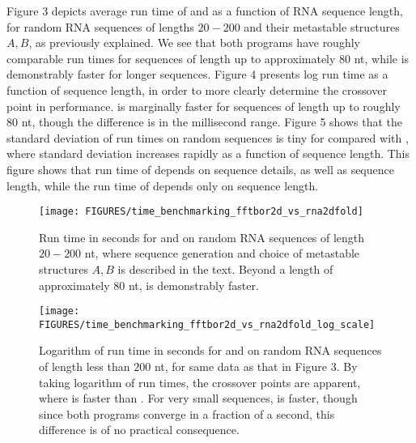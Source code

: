 Figure 3 depicts average run time of \rnatwofold
and \ffttwo as a function of RNA sequence length, for random RNA
sequences of lengths $20-200$ and their metastable structures $A,B$, as
previously explained.  We see that both programs have
roughly comparable run times for sequences of length up to approximately
80 nt, while \ffttwo is demonstrably faster for longer sequences.
Figure 4 presents log run time as a function of sequence length, in order
to more clearly determine the crossover point in performance.
\rnatwofold is marginally faster for sequences of
length up to roughly 80 nt, though the difference is in the millisecond
range.
Figure 5
shows that the standard deviation of run times on random sequences is
tiny for \ffttwo compared with \rnatwofold, where standard
deviation increases rapidly as a function of sequence length. This figure
shows that run time of \rnatwofold depends on sequence details, as
well as sequence length, while the run time of \ffttwo depends only
on sequence length.

\begin{figure}[!t]
\begin{center}
\texttt{[image: FIGURES/time\_benchmarking\_fftbor2d\_vs\_rna2dfold]}
\caption{\small
Run time in seconds for \rnatwofold and \ffttwo on random
RNA sequences of length $20-200$ nt, where sequence generation and
choice of metastable structures $A,B$ is described in the text.
Beyond a length of approximately $80$ nt, \ffttwo is demonstrably
faster.
}
\label{fig:benchmarking1}
\end{center}
\end{figure}


\begin{figure}[!b]
\begin{center}
\texttt{[image: FIGURES/time\_benchmarking\_fftbor2d\_vs\_rna2dfold\_log\_scale]}
\caption{\small
Logarithm of run time in seconds for \rnatwofold and \ffttwo
on random RNA sequences of length less than $200$ nt, for same data as that
in Figure 3. By taking logarithm of run times, the
crossover points are apparent,
where \ffttwo is faster than \rnatwofold. For very small
sequences, \rnatwofold is faster, though since both programs converge
in a fraction of a second, this difference is of no practical consequence.
}
\label{fig:benchmarking2}
\end{center}
\end{figure}

